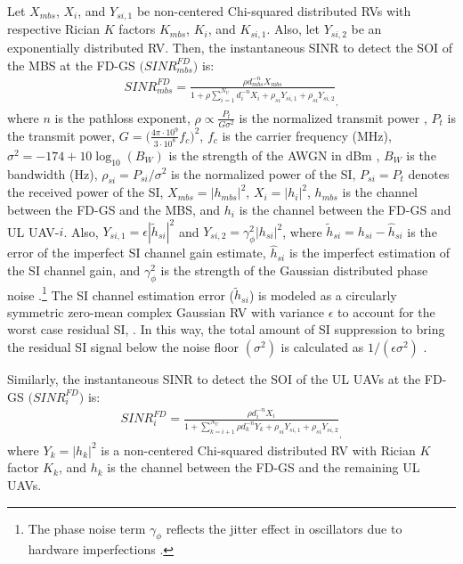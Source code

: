 Let $X_{mbs}$, $X_i$, and $Y_{si,1}$ be non-centered Chi-squared distributed RVs with respective Rician $K$ factors $K_{mbs}$, $K_i$, and $K_{si,1}$. Also, let $Y_{si,2}$ be an exponentially distributed RV. Then, the instantaneous SINR to detect the SOI of the MBS at the FD-GS $\Big(SINR_{mbs}^{FD}\Big)$ is:
\begin{eqnarray} \label{NOMA_aided_multi_UAV_FD_HetNet_fd_noma_mbs_sinr}
SINR_{mbs}^{FD} = \frac{ \rho d_{mbs}^{-n} X_{mbs}}{1 + \rho \sum_{i=1}^{N_U} d_i^{-n} X_{i} + \rho_{si} Y_{si,1} + \rho_{si}  Y_{si,2}}_,
\end{eqnarray}
where $n$ is the pathloss exponent, $\rho  \propto \frac{P_t}{G\sigma^2}$ is the normalized transmit power \cite{ernest2019outage}, $P_t$ is the transmit power, $G = \big(\frac{4 \pi \cdot 10^9}{3 \cdot 10^8} f_c\big)^2$, $f_c$ is the carrier frequency (MHz), $\sigma^2 = -174 + 10\log_{10}(B_W)$ is the strength of the AWGN in dBm \cite{hou2019exploiting}, $B_W$ is the bandwidth (Hz), $\rho_{si}  = P_{si} /\sigma^2$ is the normalized power of the SI, $P_{si} = P_t$ denotes the received power of the SI, $X_{mbs} = |h_{mbs}|^2$, $X_{i} = |h_{i}|^2$, $h_{mbs}$ is the channel between the FD-GS and the MBS, and $h_{i}$ is the channel between the FD-GS and UL UAV-$i$. Also, $Y_{si,1} = \epsilon |\widetilde{h}_{si}|^2$ and $Y_{si,2} = \gamma_{\phi}^2 |h_{si}|^2$, where $\widetilde{h}_{si}=h_{si}-\widehat{h}_{si}$ is the error of the imperfect SI channel gain estimate, $\widehat{h}_{si}$ is the imperfect estimation of the SI channel gain, and $\gamma_{\phi}^2$ is the strength of the Gaussian distributed phase noise \cite{sahai2013impact}.\footnote{The phase noise term $\gamma_{\phi}$ reflects the jitter effect in oscillators due to hardware imperfections \cite{sahai2013impact}.} The SI channel estimation error ($\widetilde{h}_{si}$) is modeled as a circularly symmetric zero-mean complex Gaussian RV with variance $\epsilon$ to account for the worst case residual SI, \cite{tan2018joint,ernest2019outage,zlatanov2017capacity}. In this way, the total amount of SI suppression to bring the residual SI signal below the noise floor $(\sigma^2)$ is calculated as $1 / (\epsilon\sigma^2)$ \cite{ernest2019outage}. 

Similarly, the instantaneous SINR to detect the SOI of the UL UAVs at the FD-GS $\Big(SINR_{i}^{FD}\Big)$ is:
\begin{eqnarray} \label{NOMA_aided_multi_UAV_FD_HetNet_fd_noma_uav_i_sinr}
SINR_{i}^{FD} = \frac{ \rho  d_{i}^{-n} X_i}{1 + \sum_{k=i+1}^{N_U} \rho  d_k^{-n} Y_k + \rho_{si}  Y_{si,1} + \rho_{si}  Y_{si,2}}_,
\end{eqnarray}
where $Y_{k} = |h_k|^2$ is a non-centered Chi-squared distributed RV with Rician $K$ factor $K_k$, and $h_k$ is the channel between the FD-GS and the remaining UL UAVs.


